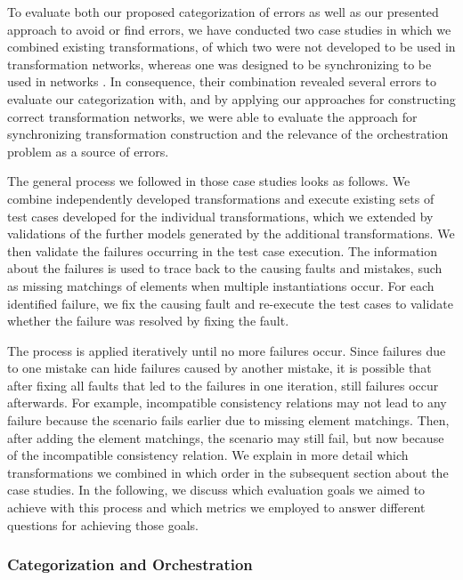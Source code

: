 To evaluate both our proposed categorization of errors as well as our presented approach to avoid or find errors, we have conducted two case studies in which we combined existing transformations, of which two were not developed to be used in transformation networks, whereas one was designed to be synchronizing to be used in networks .
In consequence, their combination revealed several errors to evaluate our categorization with, and by applying our approaches for constructing correct transformation networks, we were able to evaluate the approach for synchronizing transformation construction and the relevance of the orchestration problem as a source of errors.

The general process we followed in those case studies looks as follows.
We combine independently developed transformations and execute existing sets of test cases developed for the individual transformations, which we extended by validations of the further models generated by the additional transformations.
We then validate the failures occurring in the test case execution.
The information about the failures is used to trace back to the causing faults and mistakes, such as missing matchings of elements when multiple instantiations occur.
For each identified failure, we fix the causing fault and re-execute the test cases to validate whether the failure was resolved by fixing the fault.

The process is applied iteratively until no more failures occur.
Since failures due to one mistake can hide failures caused by another mistake, it is possible that after fixing all faults that led to the failures in one iteration, still failures occur afterwards.
For example, incompatible consistency relations may not lead to any failure because the scenario fails earlier due to missing element matchings. Then, after adding the element matchings, the scenario may still fail, but now because of the incompatible consistency relation.
We explain in more detail which transformations we combined in which order in the subsequent section about the case studies.
In the following, we discuss which evaluation goals we aimed to achieve with this process and which metrics we employed to answer different questions for achieving those goals.


\subsubsection{Categorization and Orchestration}

